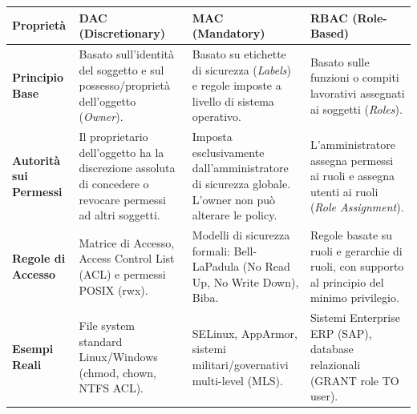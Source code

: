 \documentclass[11pt,a4paper]{article}
\begin{document}
\begin{solutionbox}
\begin{center}
\small
\begin{tabularx}{\textwidth}{lXXX}
\toprule
\textbf{Propriet\`a} & \textbf{DAC (Discretionary)} & \textbf{MAC (Mandatory)} & \textbf{RBAC (Role-Based)} \\
\midrule
\textbf{Principio Base} & Basato sull'identit\`a del soggetto e sul possesso/propriet\`a dell'oggetto (\textit{Owner}). & Basato su etichette di sicurezza (\textit{Labels}) e regole imposte a livello di sistema operativo. & Basato sulle funzioni o compiti lavorativi assegnati ai soggetti (\textit{Roles}). \\
\textbf{Autorit\`a sui Permessi} & Il proprietario dell'oggetto ha la discrezione assoluta di concedere o revocare permessi ad altri soggetti. & Imposta esclusivamente dall'amministratore di sicurezza globale. L'owner non pu\`o alterare le policy. & L'amministratore assegna permessi ai ruoli e assegna utenti ai ruoli (\textit{Role Assignment}). \\
\textbf{Regole di Accesso} & Matrice di Accesso, Access Control List (ACL) e permessi POSIX (rwx). & Modelli di sicurezza formali: Bell-LaPadula (No Read Up, No Write Down), Biba. & Regole basate su ruoli e gerarchie di ruoli, con supporto al principio del minimo privilegio. \\
\textbf{Esempi Reali} & File system standard Linux/Windows (chmod, chown, NTFS ACL). & SELinux, AppArmor, sistemi militari/governativi multi-level (MLS). & Sistemi Enterprise ERP (SAP), database relazionali (GRANT role TO user). \\
\bottomrule
\end{tabularx}
\end{center}
\end{solutionbox}
\end{document}

